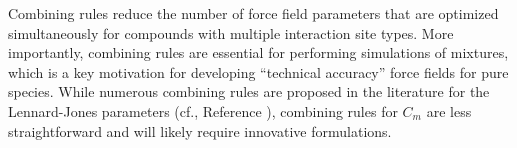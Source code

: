 \documentclass[12pt,a4paper]{article}
\begin{document}
Combining rules reduce the number of force field parameters that are optimized simultaneously for compounds with multiple interaction site types. More importantly, combining rules are essential for performing simulations of mixtures, which is a key motivation for developing ``technical accuracy'' force fields for pure species. While numerous combining rules are proposed in the literature for the Lennard-Jones parameters (cf., Reference ), combining rules for $C_m$ are less straightforward and will likely require innovative formulations.


%


\end{document}
